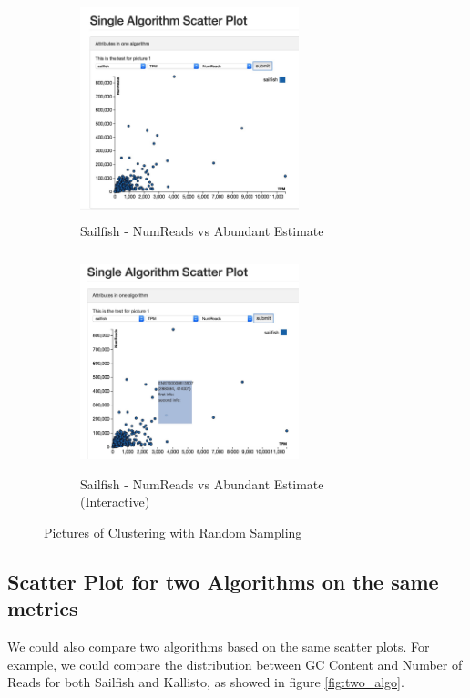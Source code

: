 \documentclass[11pt,letter]{article}
\begin{document}
\begin{figure}[h!]
        \centering
	\begin{subfigure}[h]{0.5\textwidth}
                \includegraphics[height=2.5in, width=2.5in]{fig/single_algo_sailfish.jpg}
		\caption{Sailfish - NumReads vs Abundant Estimate}
                \label{fig:single_algo_sailfish}
        \end{subfigure}%
        \begin{subfigure}[h]{0.5\textwidth}
                \includegraphics[height=2.5in, width=2.5in]{fig/interactive_single_algo_sailfish.jpg}
                \caption{Sailfish - NumReads vs Abundant Estimate (Interactive)}
                \label{fig:interactive_single_algo_sailfish}
        \end{subfigure}
        \caption{Pictures of Clustering with Random Sampling}\label{fig:cluster}
\end{figure}


\subsection {Scatter Plot for two Algorithms on the same metrics}
We could also compare two algorithms based on the same scatter plots. For example, we could compare the distribution between GC Content and Number of Reads for both Sailfish and Kallisto, as showed in figure \ref{fig:two_algo}.
\end{document}
